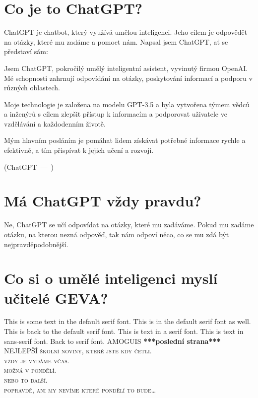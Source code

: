 \documentclass[twoside, 12pt]{article}
\let\oldquote\quote
\let\endoldquote\endquote
\renewenvironment{quote}[2][]
{\if\relax\detokenize{#1}\relax
        \def\quoteauthor{#2}%
    \else
        \def\quoteauthor{#2~---~#1}%
    \fi
    \oldquote}
{\par\nobreak\smallskip\hfill(\quoteauthor)%
    \endoldquote\addvspace{\bigskipamount}}
\begin{document}


\section*{Co je to ChatGPT?}

ChatGPT je chatbot, který využívá umělou inteligenci. Jeho cílem je odpovědět na otázky, které mu zadáme a pomoct nám. Napsal jsem ChatGPT, ať se představí sám:

\begin{quote}{ChatGPT}
    Jsem ChatGPT, pokročilý umělý inteligentní asistent, vyvinutý firmou OpenAI. Mé schopnosti zahrnují odpovídání na otázky, poskytování informací a podporu v různých oblastech.

Moje technologie je založena na modelu GPT-3.5 a byla vytvořena týmem vědců a inženýrů s cílem zlepšit přístup k informacím a podporovat uživatele ve vzdě\-lávání a každodenním životě.

Mým hlavním posláním je pomáhat lidem získávat pot\-řebné informace rychle a efektivně, a tím přispívat k jejich učení a rozvoji.
\end{quote}

\section*{Má ChatGPT vždy pravdu?}

Ne, ChatGPT se učí odpovídat na otázky, které mu zadáváme. Pokud mu zadáme otázku, na kterou nezná odpověď, tak nám odpoví něco, co se mu zdá být nejpravděpodobnější. 

\section*{Co si o umělé inteligenci myslí učitelé GEVA?}

This is some text in the default serif font. {\rmfamily This is in the default serif font as well.} This is back to the default serif font.
This is text in a serif font. {\sffamily This is text in sans-serif font.} Back to serif font.
AMOGUIS
\clearpage
\centering
\textbf{***poslední strana***}\\

\noindent \textsc{\Large NEJLEPŠÍ školní noviny, které jste kdy četli.}\\[0.5cm]
\textsc{\Large vždy je vydáme včas.}\\[0.5cm]
\textsc{\large možná v pondělí.}\\[0.5cm]
\textsc{\normalsize nebo to další.}\\[0.5cm]
\textsc{\small popravdě, ani my nevíme které pondělí to bude\dots}\\[0.5cm]
\vfill
{}
\tableofcontents
\end{document}
